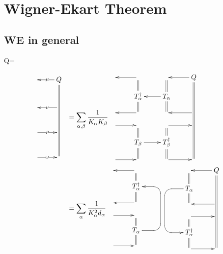 \chapter{Wigner-Ekart Theorem}
\label{ch-wigner-ekart}

\section{WE in general}

\beq
Q=
\bcen
{}
\ecen
\eeq

\begin{align}
\bcen
\xymatrix@R=1pc{
&Q\ar@2{-}[dddddd]
\ar[l]|\mu
\\&
\\
&\ar[l]|\nu
\\&
\\
\ar[r]|\rho&
\\&
\\
\ar[r]|\omega&
}
\ecen
&=
\sum_{\alp, \beta}
\frac{1}{K_\alp K_\beta}
\bcen
\xymatrix@R=1pc{
&\ar[l]&&Q
\ar@2{-}[ddddd]
\ar[l]
\\
&T_\alp^\dagger\ar@2{-}[u]
\ar@2{-}[d]&T_\alp\ar@2{-}[u]
\ar@2{-}[d]
\ar[l]
&
\\
&\ar[l]&&\ar[l]
\\
\ar[r]&&\ar[r]&
\\
&T_\beta
\ar@2{-}[u]
\ar@2{-}[d]
\ar[r]
&T_\beta^\dagger\ar@2{-}[u]
\ar@2{-}[d]
&
\\
\ar[r]&&\ar[r]&
}
\ecen
\\
&=
\sum_{\alp}
\frac{1}{K^2_\alp d_\alp}
\bcen
\xymatrix@R=1pc{
&\ar[l]&
\\
&T_\alp^\dagger\ar@2{-}[u]
\ar@2{-}[d]
&
\\
&\ar[l]&
\\
\ar[r]&&
\\
&T_\alp
\ar@2{-}[u]
\ar@2{-}[d]
\ar`r[ruuu]
`[uuu][uuu]
&
\\
\ar[r]&&
}
\xymatrix@R=1pc{
&&Q
\ar@2{-}[ddddd]
\ar[l]
\\
&T_\alp\ar@2{-}[u]
\ar@2{-}[d]
\ar`l[ld]
`[ddd][ddd]
&
\\
&&\ar[l]
\\
&\ar[r]&
\\
&T_\alp^\dagger\ar@2{-}[u]
\ar@2{-}[d]
&
\\
&\ar[r]&
}
\ecen
\end{align}


